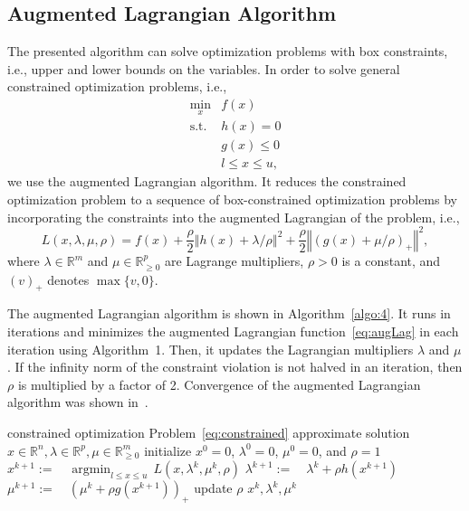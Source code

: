 \documentclass[letterpaper]{article} %
\DeclareMathOperator{\st}{s.t.}
\DeclareMathOperator{\argmin}{argmin}
\newcommand{\setR}{\mathbb{R}}
\newcommand{\norm}[1]{\left\Vert#1\right\Vert}
\begin{document}
\subsection{Augmented Lagrangian Algorithm}
The presented algorithm can solve optimization problems with box constraints, i.e.,  upper and lower bounds on the variables. In order to solve general constrained optimization problems, i.e., 
\begin{equation}\label{eq:constrained}
\begin{array}{rl}  \displaystyle
  \min_{x} &  f(x) \\
  \st &  h(x) = 0 \\
  	& g(x) \leq 0 \\
  	& l \leq x \leq u,
\end{array}
\end{equation}
we use the augmented Lagrangian algorithm. It reduces the constrained optimization problem to a sequence of box-constrained optimization problems by incorporating the constraints into the augmented Lagrangian of the problem, i.e., 
\begin{equation}
\label{eq:augLag}
  L (x, \lambda, \mu, \rho) = f(x) + \frac{\rho}{2}
  \norm{h(x)+\lambda /\rho}^2 + \frac{\rho}{2} \norm{\left(g(x)
    + \mu /\rho\right)_+}^2,
\end{equation}
where $\lambda\in\setR^m$ and $\mu\in\setR_{\geq 0}^p$ are Lagrange
multipliers, $\rho >0$ is a constant, and $(v)_+$ denotes $\max\{v, 0\}$. 

The augmented Lagrangian algorithm is shown in Algorithm~\ref{algo:4}. It runs in iterations and minimizes the augmented Lagrangian function~\eqref{eq:augLag} in each iteration using Algorithm~1. Then, it updates the Lagrangian multipliers $\lambda$ and $\mu$. If the infinity norm of the constraint violation is not halved in an iteration, then $\rho$ is multiplied by a factor of 2. Convergence of the augmented Lagrangian algorithm was shown in~\cite{Bertsekas99, Birgin14}.




\begin{algorithm}[h!]
  \caption{Augmented Lagrangian Algorithm}
  \label{algo:4}
  \begin{algorithmic}[1]
     constrained optimization Problem~\eqref{eq:constrained}
     approximate solution $x\in\setR^{n},
    \lambda\in\setR^{p}, \mu\in\setR_{\geq 0}^{m}$ 
    \STATE initialize $x^0 = 0$, $\lambda^0 = 0$, $\mu^0 = 0$, and $\rho=1$
    \REPEAT
    \STATE  $x^{k+1} :=\quad \argmin_{l\leq x\leq u}\, L(x, \lambda^k, \mu^k, \rho)$ \label{algo:x}
    \STATE $\lambda^{k+1} :=\quad  \lambda^k + \rho h(x^{k+1})$ \label{algo:lambda}
    \STATE $\mu^{k+1} :=\quad  \left(\mu^k + \rho g(x^{k+1})\right)_+$ \label{algo:mu}
    \STATE update $\rho$ \label{algo:rho}
    \RETURN $x^k, \lambda^k, \mu^k$
  \end{algorithmic}
\end{algorithm}
\end{document}
